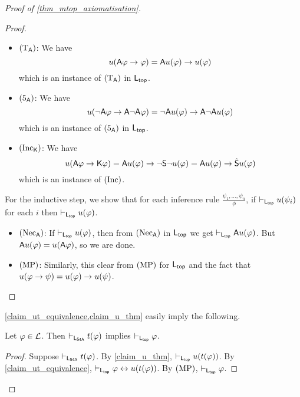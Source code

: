 \begin{proof}[Proof of \cref{thm_mtop_axiomatisation}]
\begin{proof}
\begin{itemize}
        \item $(\text{T}_{\mathsf{A}})$: We have
        \[
        u(\mathsf{A}\varphi \to \varphi)
=
\mathsf{A} u(\varphi) \to u(\varphi)\]
        which is an instance of $(\text{T}_{\mathsf{A}})$ in $\mathsf{L}_{\mathsf{top}}$.

        \item $(\text{5}_{\mathsf{A}})$: We have
        \[
        u(\neg\mathsf{A}\varphi \to \mathsf{A}\neg\mathsf{A}\varphi)
=
\neg\mathsf{A} u(\varphi) \to \mathsf{A} \neg\mathsf{A} u(\varphi)\]
        which is an instance of $(\text{5}_{\mathsf{A}})$ in $\mathsf{L}_{\mathsf{top}}$.

        \item $(\text{Inc}_{\mathsf{K}})$: We have
        \[
        u(\mathsf{A}\varphi \to \mathsf{K}\varphi)
=
\mathsf{A} u(\varphi) \to \neg\mathsf{S}\neg u(\varphi)
=
\mathsf{A} u(\varphi) \to \hat{\mathsf{S}} u(\varphi)\]
        which is an instance of $(\text{Inc})$.

        \end{itemize}
    For the inductive step, we show that for each inference rule
$\frac{\psi_1,\ldots,\psi_n}{\phi}$, if
$\vdash_{\mathsf{L}_{\mathsf{top}}}u(\psi_i)$ for each $i$ then
$\vdash_{\mathsf{L}_{\mathsf{top}}}u(\varphi)$.

    \begin{itemize}\small
    \item $(\text{Nec}_{\mathsf{A}})$: If $\vdash_{\mathsf{L}_{\mathsf{top}}} u(\varphi)$, then from
$(\text{Nec}_{\mathsf{A}})$ in $\mathsf{L}_{\mathsf{top}}$ we get
$\vdash_{\mathsf{L}_{\mathsf{top}}} \mathsf{A} u(\varphi)$. But $\mathsf{A} u(\varphi) =
u(\mathsf{A}\varphi)$, so we are done.

        \item $(\text{MP})$: Similarly, this clear from $(\text{MP})$ for
$\mathsf{L}_{\mathsf{top}}$ and the fact that $u(\varphi \to \psi) =
u(\varphi) \to u(\psi)$.

        \end{itemize}
    \end{proof}

\cref{claim_ut_equivalence,claim_u_thm} easily imply the following.

\begin{claim}
\label{claim_t_thm}

Let $\varphi \in \mathcal{L}$. Then
$\vdash_{\mathsf{L}_{\mathsf{S4A}}} t(\varphi)$ implies $\vdash_{\mathsf{L}_{\mathsf{top}}}
\varphi$.

\end{claim}

    \begin{proof}
    Suppose $\vdash_{\mathsf{L}_{\mathsf{S4A}}} t(\varphi)$. By \cref{claim_u_thm},
$\vdash_{\mathsf{L}_{\mathsf{top}}} u(t(\varphi))$. By \cref{claim_ut_equivalence},
$\vdash_{\mathsf{L}_{\mathsf{top}}} \varphi \leftrightarrow u(t(\varphi))$. By
$(\text{MP})$, $\vdash_{\mathsf{L}_{\mathsf{top}}} \varphi$.

    \end{proof}


\end{proof}
